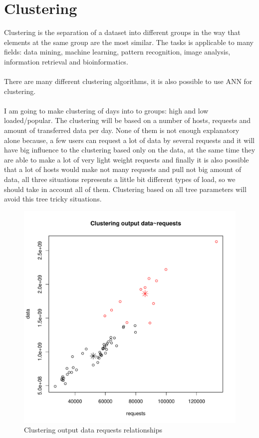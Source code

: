 \documentclass[english]{article}
\begin{document}
\section{Clustering}
Clustering is the separation of a dataset into different groups in the way that elements at the same group are the most similar. The tasks is applicable to many fields:  data mining, machine learning, pattern recognition, image analysis, information retrieval and bioinformatics.\\\\
There are many different clustering algorithms, it is also possible to use ANN for clustering.\\\\
I am going to make clustering of days into to groups: high and low loaded/popular. The clustering will be based on a number of hosts, requests and amount of transferred data per day. None of them is not enough explanatory alone because, a few users can request a lot of data by several requests and it will have big influence to the clustering based only on the data, at the same time they are able to make a lot of very light weight requests and finally it is also possible that a lot of hosts would make not many requests and pull not big amount of data, all three situations represents a little bit different types of load, so we should take in account all of them.
Clustering based on all tree parameters will avoid this tree tricky situations.
\begin{figure}
\centerline{\includegraphics{Weblogs/ClusteringOutput1}}
\caption{Clustering output data requests relationships}
\end{figure}
\end{document}
